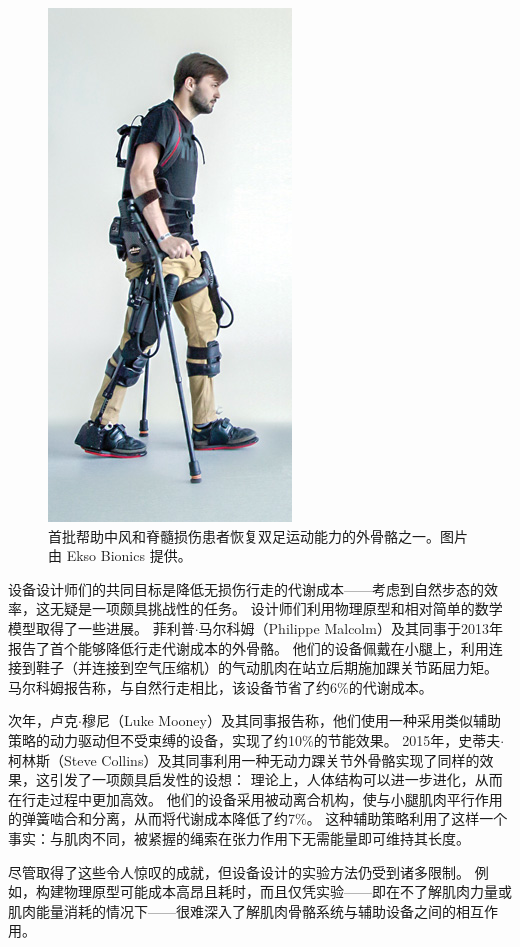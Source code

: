 \begin{figure}[!htb]
	\centering
	\includegraphics[width=0.4\linewidth]{chap11/11_18}
	\caption{首批帮助中风和脊髓损伤患者恢复双足运动能力的外骨骼之一。图片由 Ekso Bionics 提供。 \label{fig:11_18}}
\end{figure}


设备设计师们的共同目标是降低无损伤行走的代谢成本——考虑到自然步态的效率，这无疑是一项颇具挑战性的任务。
设计师们利用物理原型和相对简单的数学模型取得了一些进展。
菲利普$\cdot$马尔科姆（Philippe Malcolm）及其同事于2013年报告了首个能够降低行走代谢成本的外骨骼。
他们的设备佩戴在小腿上，利用连接到鞋子（并连接到空气压缩机）的气动肌肉在站立后期施加踝关节跖屈力矩。
马尔科姆报告称，与自然行走相比，该设备节省了约6\%的代谢成本。


次年，卢克$\cdot$穆尼（Luke Mooney）及其同事报告称，他们使用一种采用类似辅助策略的动力驱动但不受束缚的设备，实现了约10\%的节能效果。
2015年，史蒂夫$\cdot$柯林斯（Steve Collins）及其同事利用一种无动力踝关节外骨骼实现了同样的效果，这引发了一项颇具启发性的设想：
理论上，人体结构可以进一步进化，从而在行走过程中更加高效。
他们的设备采用被动离合机构，使与小腿肌肉平行作用的弹簧啮合和分离，从而将代谢成本降低了约7\%。
这种辅助策略利用了这样一个事实：与肌肉不同，被紧握的绳索在张力作用下无需能量即可维持其长度。


尽管取得了这些令人惊叹的成就，但设备设计的实验方法仍受到诸多限制。
例如，构建物理原型可能成本高昂且耗时，而且仅凭实验——即在不了解肌肉力量或肌肉能量消耗的情况下——很难深入了解肌肉骨骼系统与辅助设备之间的相互作用。


